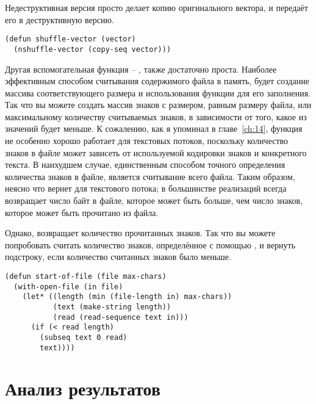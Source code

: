 Недеструктивная версия просто делает копию оригинального вектора, и передаёт его в
деструктивную версию.

\begin{lstlisting}
(defun shuffle-vector (vector)
  (nshuffle-vector (copy-seq vector)))
\end{lstlisting}

Другая вспомогательная функция -- , также достаточно проста.  Наиболее
эффективным способом считывания содержимого файла в память, будет создание массива
соответствующего размера и использования функции  для его заполнения.
Так что вы можете создать массив знаков с размером, равным размеру файла, или
максимальному количеству считываемых знаков, в зависимости от того, какое из значений
будет меньше.  К сожалению, как я упоминал в главе~\ref{ch:14}, функция 
не особенно хорошо работает для текстовых потоков, поскольку количество знаков в файле
может зависеть от используемой кодировки знаков и конкретного текста.  В наихудшем случае,
единственным способом точного определения количества знаков в файле, является считывание
всего файла.  Таким образом, неясно что вернет  для текстового потока; в
большинстве реализаций  всегда возвращает число байт в файле, которое
может быть больше, чем число знаков, которое может быть прочитано из файла.

Однако,  возвращает количество прочитанных знаков.  Так что вы можете
попробовать считать количество знаков, определённое с помощью , и вернуть
подстроку, если количество считанных знаков было меньше.

\begin{lstlisting}
(defun start-of-file (file max-chars)
  (with-open-file (in file)
    (let* ((length (min (file-length in) max-chars))
           (text (make-string length))
           (read (read-sequence text in)))
      (if (< read length)
        (subseq text 0 read)
        text))))
\end{lstlisting}


\section{Анализ результатов}

